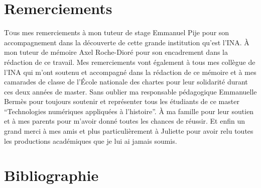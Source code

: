 \documentclass[12pt,twoside, openany]{book} %
\begin{document}
	\chapter{Remerciements}
	
\lettrine{T}ous mes remerciements à mon tuteur de stage Emmanuel Pije pour son accompagnement dans la découverte de cette grande institution qu'est l'INA. À mon tuteur de mémoire Axel Roche-Dioré pour son encadrement dans la rédaction de ce travail. Mes remerciements vont également à tous mes collègue de l'INA qui m'ont soutenu et accompagné dans la rédaction de ce mémoire et à mes camarades de classe de l'École nationale des chartes pour leur solidarité durant ces deux années de master. Sans oublier ma responsable pédagogique Emmanuelle Bermès pour toujours soutenir et représenter tous les étudiants de ce master \enquote{Technologies numériques appliquées à l'histoire}. À ma famille pour leur soutien et à mes parents pour m'avoir donné toutes les chances de réussir. Et enfin un grand merci à mes amis et plus particulièrement à Juliette pour avoir relu toutes les productions académiques que je lui ai jamais soumis. 
	\newpage{\pagestyle{empty}\cleardoublepage}
	

	\chapter{Bibliographie}
	
	\printbibliography[heading=stylebib, keyword=histoire_patrimoine, title={Histoire et patrimoine}]
	
	\printbibliography[heading=stylebib, keyword=TD, title={Catalogage et traitement documentaire}]
	
	\printbibliography[heading=stylebib, keyword=ina, title={Institut National de l'Audiovisuel}]
	
	\printbibliography[heading=stylebib, keyword=archives, title={Archives}]
	
	\printbibliography[heading=stylebib, keyword=numerique, title={Numérique et documents}]
	
	\printbibliography[heading=stylebib, keyword=donnees, title={Données}]
	
	\printbibliography[heading=stylebib, keyword=expe, title={Expérience Utilisateur}]
	
\end{document}
